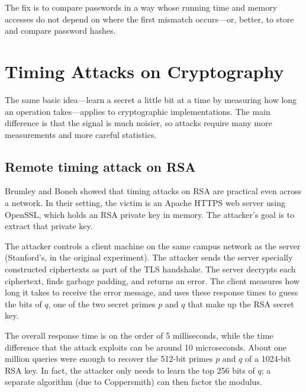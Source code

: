 The fix is to compare passwords in a way whose running time and memory
accesses do not depend on where the first mismatch occurs---or, better,
to store and compare password hashes.

\section{Timing Attacks on Cryptography}
\label{sec:sc:crypto}

The same basic idea---learn a secret a little bit at a time by
measuring how long an operation takes---applies to cryptographic
implementations.
The main difference is that the signal is much noisier, so attacks
require many more measurements and more careful statistics.

\subsection{Remote timing attack on RSA}

Brumley and Boneh showed that timing attacks on RSA are practical even
across a network.\autocite{brumley:remote-timing}
In their setting, the victim is an Apache HTTPS web server using
OpenSSL, which holds an RSA private key in memory.
The attacker's goal is to extract that private key.

The attacker controls a client machine on the same campus network as the
server (Stanford's, in the original experiment).
The attacker sends the server specially constructed ciphertexts as part
of the TLS handshake.
The server decrypts each ciphertext, finds garbage padding, and returns
an error.
The client measures how long it takes to receive the error message, and
uses these response times to guess the bits of $q$, one of the two
secret primes $p$ and $q$ that make up the RSA secret key.

The overall response time is on the order of 5 milliseconds, while
the time difference that the attack exploits can be around
10 microseconds.
About one million queries were enough to recover the 512-bit primes
$p$ and $q$ of a 1024-bit RSA key.
In fact, the attacker only needs to learn the top 256 bits of $q$; a
separate algorithm (due to Coppersmith) can then factor the modulus.

